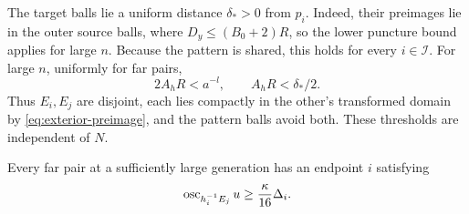 The target balls lie a uniform distance $\delta_*>0$ from $p_i$.
Indeed, their preimages lie in the outer source balls, where
$D_y\le(B_0+2)R$, so the lower puncture bound applies for large $n$.
Because the pattern is shared, this holds for every $i\in\mathcal I$.
For large $n$, uniformly for far pairs,
\[
 2A_hR<a^{-l},\qquad A_hR<\delta_*/2.
\]
Thus $E_i,E_j$ are disjoint, each lies compactly in the other's
transformed domain by \eqref{eq:exterior-preimage}, and the pattern
balls avoid both. These thresholds are independent of $N$.

\begin{lemma}
\label{lem:pair-alternative}
Every far pair at a sufficiently large generation has an endpoint
$i$ satisfying
\begin{equation}
 \operatorname{osc}_{h_i^{-1}E_j}u\ge\frac{\kappa}{16}\Delta_i.
 \label{eq:pair-alternative}
\end{equation}
\end{lemma}

